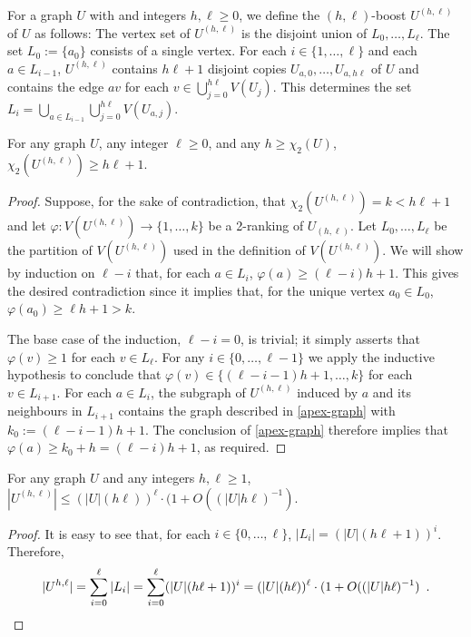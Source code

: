 \documentclass[kpfonts]{patmorin}
\newcommand{\trn}{\chi_2}
\theoremstyle{named}
\begin{document}
For a graph $U$ with and integers $h,\ell\ge 0$, we define the $(h,\ell)$-boost $U^{(h,\ell)}$ of $U$ as follows: The vertex set of $U^{(h,\ell)}$ is the disjoint union of $L_0,\ldots,L_\ell$.  The set $L_0:=\{a_0\}$ consists of a single vertex. For each $i\in\{1,\ldots,\ell\}$ and each $a\in L_{i-1}$, $U^{(h,\ell)}$ contains $h\ell+1$ disjoint copies $U_{a,0},\ldots,U_{a,h\ell}$ of $U$ and contains the edge $av$ for each $v\in\bigcup_{j=0}^{h\ell} V(U_j)$.  This determines the set $L_i=\bigcup_{a\in L_{i-1}}\bigcup_{j=0}^{h\ell} V(U_{a,j})$.

\begin{lem}\label{boost}
    For any graph $U$, any integer $\ell\ge 0$, and any $h\ge\trn(U)$, $\trn(U^{(h,\ell)})\ge h\ell +1$.
\end{lem}

\begin{proof}
    Suppose, for the sake of contradiction, that $\trn(U^{(h,\ell)})=k<h\ell+1$ and let $\varphi:V(U^{(h,\ell)})\to\{1,\ldots,k\}$ be a 2-ranking of $U_{(h,\ell)}$.  Let $L_0,\ldots,L_{\ell}$ be the partition of $V(U^{(h,\ell)})$ used in the definition of $V(U^{(h,\ell)})$.
    We will show by induction on $\ell-i$ that, for each $a\in L_{i}$, $\varphi(a)\ge(\ell-i)h+1$. This gives the desired contradiction since it implies that, for the unique vertex $a_0\in L_0$, $\varphi(a_0)\ge \ell h+1 > k$.

    The base case of the induction, $\ell-i=0$, is trivial; it simply asserts that $\varphi(v)\ge 1$ for each $v\in L_\ell$.  For any $i\in\{0,\ldots,\ell-1\}$ we apply the inductive hypothesis to conclude that $\varphi(v)\in\{(\ell-i-1)h+1,\ldots,k\}$ for each $v\in L_{i+1}$.  For each $a\in L_i$, the subgraph of $U^{(h,\ell)}$ induced by $a$ and its neighbours in $L_{i+1}$ contains the graph described in \cref{apex-graph} with $k_0:=(\ell-i-1)h+1$.  The conclusion of \cref{apex-graph} therefore implies that $\varphi(a)\ge k_0+h=(\ell-i)h+1$, as required.
\end{proof}

\begin{lem}\label{boost-size}
    For any graph $U$ and any integers $h,\ell \ge 1$, $|U^{(h,\ell)}| \le (|U|(h\ell))^{\ell}\cdot (1+O((|U|h\ell)^{-1})$.
\end{lem}

\begin{proof}
    It is easy to see that, for each $i\in \{0,\ldots,\ell\}$, $|L_i|=(|U|(h\ell+1))^i$.  Therefore,
    \[ |U^{h,\ell}| = \sum_{i=0}^\ell |L_i| = \sum_{i=0}^\ell (|U|(h\ell+1))^i = (|U|(h\ell))^{\ell}\cdot (1+O((|U|h\ell)^{-1}) \enspace . \qedhere
    \]
\end{proof}
\end{document}
